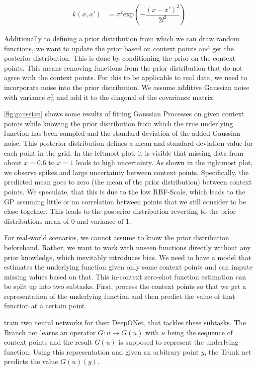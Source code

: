 \begin{align}
k(x,x') &= \sigma^2\text{exp}\left(-\dfrac{(x-x')^2}{2l^2}\right) \label{eq:rbf}
\end{align}

Additionally to defining a prior distribution from which we can draw random functions, we want to update the prior based on context points and get the posterior distribution. This is done by conditioning the prior on the context points. This means removing functions from the prior distribution that do not agree with the context points. For this to be applicable to real data, we need to incorporate noise into the prior distribution. We assume additive Gaussian noise with variance $\sigma_n^2$ and add it to the diagonal of the covariance matrix. \cite{williams2006gaussian}

\autoref{fig:gaussian} shows some results of fitting Gaussian Processes on given context points while knowing the prior distribution from which the true underlying function has been sampled and the standard deviation of the added Gaussian noise. This posterior distribution defines a mean and standard deviation value for each point in the grid. In the leftmost plot, it is visible that missing data from about $x=0.6$ to $x=1$ leads to high uncertainty. As shown in the rightmost plot, we observe spikes and large uncertainty between context points. Specifically, the predicted mean goes to zero (the mean of the prior distribution) between context points. We speculate, that this is due to the low RBF-Scale, which leads to the GP assuming little or no correlation between points that we still consider to be close together. This leads to the posterior distribution reverting to the prior distributions mean of 0 and variance of 1.

For real-world scenarios, we cannot assume to know the prior distribution beforehand. Rather, we want to work with unseen functions directly without any prior knowledge, which inevitably introduces bias. We need to have a model that estimates the underlying function given only some context points and can impute missing values based on that. This in-context zero-shot function estimation can be split up into two subtasks. First, process the context points so that we get a representation of the underlying function and then predict the value of that function at a certain point.

\citet{Lu_2021} train two neural networks for their DeepONet, that tackles these subtasks. The Branch net learns an operator $G: u\rightarrow G(u)$ with $u$ being the sequence of context points and the result $G(u)$ is supposed to represent the underlying function. Using this representation and given an arbitrary point $y$, the Trunk net predicts the value $G(u)(y)$. \cite{Lu_2021}


